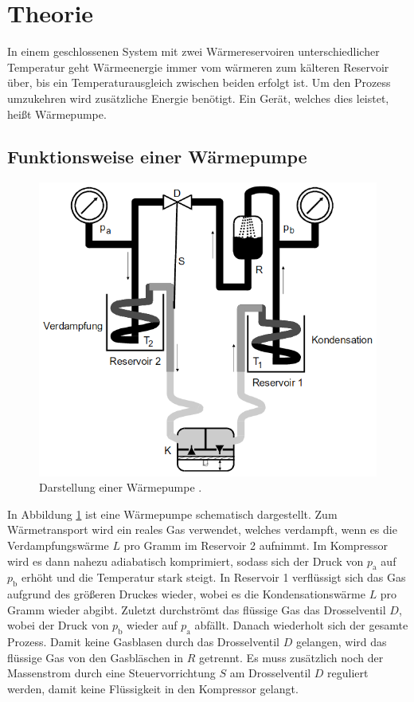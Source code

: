 
\section{Theorie}
\label{sec:Theorie}
In einem geschlossenen System mit zwei Wärmereservoiren unterschiedlicher Temperatur geht
  Wärmeenergie immer vom wärmeren zum kälteren Reservoir über, bis ein
  Temperaturausgleich zwischen beiden erfolgt ist. Um den Prozess
  umzukehren wird zusätzliche Energie benötigt. Ein Gerät, welches dies leistet,
  heißt Wärmepumpe.
 \subsection{Funktionsweise einer Wärmepumpe}
  \begin{figure}
  	\centering
  	\includegraphics[width=\linewidth-100pt,height=\textheight-100pt,keepaspectratio]{content/Bilder/Aufbau.png}
  	\caption{Darstellung einer Wärmepumpe \cite{V206}.}
  	\label{fig:Aufbau1}
  \end{figure}
In Abbildung \ref{fig:Aufbau1} ist eine Wärmepumpe schematisch dargestellt.
Zum Wärmetransport wird ein reales Gas verwendet, welches verdampft,
wenn es die Verdampfungswärme $L$ pro Gramm im Reservoir 2 aufnimmt. Im Kompressor wird es dann nahezu adiabatisch komprimiert, sodass sich der Druck von $p_\text{a}$ auf $p_\text{b}$ erhöht und die Temperatur stark steigt. In Reservoir 1 verflüssigt sich das Gas aufgrund des größeren Druckes wieder, wobei es die Kondensationswärme $L$ pro Gramm wieder abgibt. Zuletzt durchströmt das flüssige Gas das Drosselventil $D$, wobei der Druck von $p_\text{b}$ wieder auf $p_\text{a}$ abfällt. Danach wiederholt sich der gesamte Prozess. Damit keine Gasblasen durch das Drosselventil $D$ gelangen, wird das flüssige Gas von den Gasbläschen in $R$ getrennt. Es muss zusätzlich noch der Massenstrom durch eine Steuervorrichtung $S$ am Drosselventil $D$ reguliert werden, damit keine Flüssigkeit in den Kompressor gelangt. 

